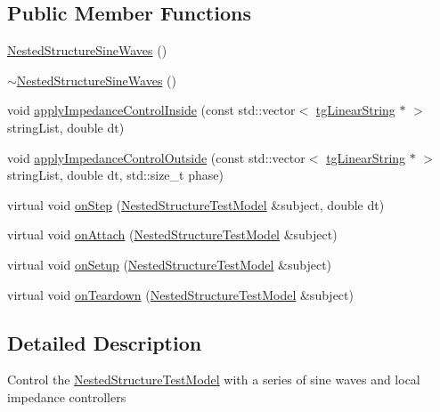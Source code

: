 \subsection*{Public Member Functions}
\begin{DoxyCompactItemize}
\item 
\hyperlink{class_nested_structure_sine_waves_a8794018a803f463467da113ca24fae03}{Nested\-Structure\-Sine\-Waves} ()
\item 
\hyperlink{class_nested_structure_sine_waves_a395aae92244c7dc041de171285f7c2da}{$\sim$\-Nested\-Structure\-Sine\-Waves} ()
\item 
void \hyperlink{class_nested_structure_sine_waves_ac68f98b32f41efc28bb9ac5e4a03b726}{apply\-Impedance\-Control\-Inside} (const std\-::vector$<$ \hyperlink{classtg_linear_string}{tg\-Linear\-String} $\ast$ $>$ string\-List, double dt)
\item 
void \hyperlink{class_nested_structure_sine_waves_aa7ed76a8a4797cee41a024a9b8f5b245}{apply\-Impedance\-Control\-Outside} (const std\-::vector$<$ \hyperlink{classtg_linear_string}{tg\-Linear\-String} $\ast$ $>$ string\-List, double dt, std\-::size\-\_\-t phase)
\item 
virtual void \hyperlink{class_nested_structure_sine_waves_a5066c42717c87e9f7eca0b75d29ab190}{on\-Step} (\hyperlink{class_nested_structure_test_model}{Nested\-Structure\-Test\-Model} \&subject, double dt)
\item 
virtual void \hyperlink{classtg_observer_a0ecd07483eb41f9a0ab19b8ed24052f1}{on\-Attach} (\hyperlink{class_nested_structure_test_model}{Nested\-Structure\-Test\-Model} \&subject)
\item 
virtual void \hyperlink{classtg_observer_ae7b2de87bd4a6e786bc16f1b801c36a6}{on\-Setup} (\hyperlink{class_nested_structure_test_model}{Nested\-Structure\-Test\-Model} \&subject)
\item 
virtual void \hyperlink{classtg_observer_a1663edb3732e5ffb7bbe6bfb4ade88b8}{on\-Teardown} (\hyperlink{class_nested_structure_test_model}{Nested\-Structure\-Test\-Model} \&subject)
\end{DoxyCompactItemize}


\subsection{Detailed Description}
Control the \hyperlink{class_nested_structure_test_model}{Nested\-Structure\-Test\-Model} with a series of sine waves and local impedance controllers 

